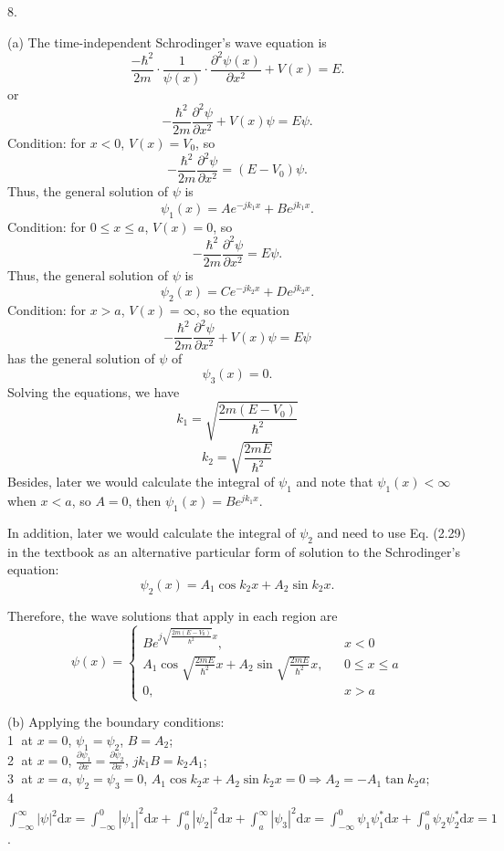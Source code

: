 \documentclass[a4paper]{article}
\begin{document}
8.

(a) The time-independent Schrodinger's wave equation is
\begin{equation}
    \frac{-\hbar^2}{2m}\cdot\frac{1}{\psi(x)}\cdot\frac{\partial^2\psi(x)}{\partial x^2}+V(x)=E.
\end{equation}
or
\begin{equation}
    -\frac{\hbar^2}{2m}\frac{\partial^2\psi}{\partial x^2}+V(x)\psi=E\psi.
\end{equation}
Condition: for $x<0$, $V(x)=V_0$, so
$$-\frac{\hbar^2}{2m}\frac{\partial^2\psi}{\partial x^2}=(E-V_0)\psi.$$
Thus, the general solution of $\psi$ is
$$\psi_1(x)=Ae^{-jk_1x}+Be^{jk_1x}.$$
Condition: for $0\leq x\leq a$, $V(x)=0$, so
$$-\frac{\hbar^2}{2m}\frac{\partial^2\psi}{\partial x^2}=E\psi.$$
Thus, the general solution of $\psi$ is
$$\psi_2(x)=Ce^{-jk_2x}+De^{jk_2x}.$$
Condition: for $x>a$, $V(x)=\infty$, so the equation
$$-\frac{\hbar^2}{2m}\frac{\partial^2\psi}{\partial x^2}+V(x)\psi=E\psi$$
has the general solution of $\psi$ of
$$\psi_3(x)=0.$$
Solving the equations, we have
$$k_1=\sqrt{\frac{2m(E-V_0)}{\hbar^2}}$$
$$k_2=\sqrt{\frac{2mE}{\hbar^2}}$$
Besides, later we would calculate the integral of $\psi_1$ and note that $\psi_1(x)<\infty$ when $x<a$, so $A=0$, then $\psi_1(x)=Be^{jk_1x}$.

In addition, later we would calculate the integral of $\psi_2$ and need to use Eq. (2.29) in the textbook as an alternative particular form of solution to the Schrodinger's equation:
$$\psi_2(x)=A_1\cos{k_2x}+A_2\sin{k_2x}.$$

Therefore, the wave solutions that apply in each region are
$$\psi(x)=\left\{\begin{array}{rcl}
    Be^{j\sqrt{\frac{2m(E-V_0)}{\hbar^2}}x},&&x<0\\
    A_1\cos{\sqrt{\frac{2mE}{\hbar^2}}x}+A_2\sin{\sqrt{\frac{2mE}{\hbar^2}}x},&&0\leq x\leq a\\
    0,&&x>a
\end{array}
\right.$$

(b) Applying the boundary conditions:\\
\textcircled{1} at $x=0$, $\psi_1=\psi_2$, $B=A_2$;\\
\textcircled{2} at $x=0$, $\frac{\partial\psi_1}{\partial x}=\frac{\partial\psi_2}{\partial x}$, $jk_1B=k_2A_1$;\\
\textcircled{3} at $x=a$, $\psi_2=\psi_3=0$, $A_1\cos{k_2x}+A_2\sin{k_2x}=0\Rightarrow A_2=-A_1\tan{k_2a};$\\
\textcircled{4} $\int_{-\infty}^\infty|\psi|^2\mathrm{d}x=\int_{-\infty}^0|\psi_1|^2\mathrm{d}x+\int_0^a|\psi_2|^2\mathrm{d}x+\int_a^\infty|\psi_3|^2\mathrm{d}x=\int_{-\infty}^0\psi_1\psi_1^*\mathrm{d}x+\int_0^a\psi_2\psi_2^*\mathrm{d}x=1$.\\
\end{document}
